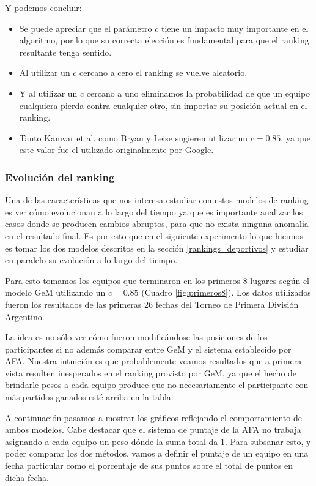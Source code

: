 Y podemos concluir:
\begin{itemize}
    \item Se puede apreciar que el parámetro $c$ tiene un impacto muy importante en
        el algoritmo, por lo que su correcta elección es fundamental para que el
        ranking resultante tenga sentido.
    \item Al utilizar un $c$ cercano a cero el ranking se vuelve aleatorio.
    \item Y al utilizar un $c$ cercano a uno eliminamos la probabilidad de que
        un equipo cualquiera pierda contra cualquier otro, sin importar su posición
        actual en el ranking.
    \item Tanto Kamvar et al.\cite{Kamvar2003} como Bryan y Leise\cite{Bryan2006}
        sugieren utilizar un $c=0.85$, ya que este valor fue el utilizado originalmente
        por Google.
\end{itemize}

\subsubsection{Evolución del ranking}

Una de las características que nos interesa estudiar con estos modelos de
ranking es ver cómo evolucionan a lo largo del tiempo ya que es importante
analizar los casos donde se producen cambios abruptos, para que no exista
ninguna anomalía en el resultado final. Es por esto que en el siguiente
experimento lo que hicimos es tomar los dos modelos descritos en la sección \ref{rankings_deportivos}
 y estudiar en paralelo su evolución a lo largo del tiempo.

Para esto tomamos los equipos que terminaron en los primeros 8 lugares según el modelo
GeM utilizando un $c = 0.85$ (Cuadro \ref{fig:primeros8}). Los datos utilizados
fueron los resultados de las primeras 26 fechas del Torneo de Primera División
Argentino.

La idea es no sólo ver cómo fueron modificándose las posiciones de los
participantes si no además comparar entre GeM y el sistema establecido por AFA.
Nuestra intuición es que probablemente veamos resultados que a primera vista
resulten inesperados en el ranking provisto por GeM, ya que el hecho de
brindarle pesos a cada equipo produce que no necesariamente el participante con
más partidos ganados esté arriba en la tabla.

A continuación pasamos a mostrar los gráficos reflejando el comportamiento de
ambos modelos. Cabe destacar que el sistema de puntaje de la AFA no trabaja
asignando a cada equipo un peso dónde la suma total da 1. Para subsanar esto,
y poder comparar los dos métodos, vamos a definir el puntaje de un equipo en una
fecha particular como el porcentaje de sus puntos sobre el total de puntos en dicha
fecha.


